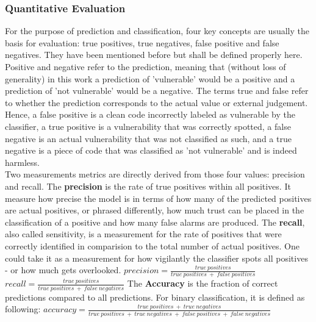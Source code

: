 \documentclass[
	a4paper,
	pagesize,
	pdftex,
	12pt,
	twoside, %
	BCOR=5mm, %
	ngerman,
	fleqn,
	final,
	]{scrartcl}
\begin{document}
\subsubsection{Quantitative Evaluation}
For the purpose of prediction and classification, four key concepts are usually the basis for evaluation: true positives, true negatives, false positive and false negatives. They have been mentioned before but shall be defined properly here. Positive and negative refer to the prediction, meaning that (without loss of generality) in this work a prediction of 'vulnerable' would be a positive and a prediction of 'not vulnerable' would be a negative. The terms true and false refer to whether the prediction corresponds to the actual value or external judgement. Hence, a false positive is a clean code incorrectly labeled as vulnerable by the classifier, a true positive is a vulnerability that was correctly spotted, a false negative is an actual vulnerability that was not classified as such, and a true negative is a piece of code that was classified as 'not vulnerable' and is indeed harmless.\\
Two measurements metrics are directly derived from those four values: precision and recall. The \textbf{precision} is the rate of true positives within all positives. It measure how precise the model is in terms of how many of the predicted positives are actual positives, or phrased differently, how much trust can be placed in the classification of a positive and how many false alarms are produced. The \textbf{recall}, also called sensitivity, is a measurement for the rate of positives that were correctly identified in comparision to the total number of actual positives. One could take it as a measurement for how vigilantly the classifier spots all positives - or how much gets overlooked.\newline
\mbox{}\newline
$precision = \frac{true~positives}{true~positives~+~false~positives}$\newline
\mbox{}\newline
$recall = \frac{true~positives}{true~positives~+~false~negatives}$\newline
\mbox{}\newline
The \textbf{Accuracy} is the fraction of correct predictions compared to all predictions. For binary classification, it is defined as following:  \newline
\mbox{}\newline
$accuracy = \frac{true~positives~+~true~negatives}{true~positives~+~true~negatives~+~false~positives~+~false~negatives}$\newline
\end{document}
